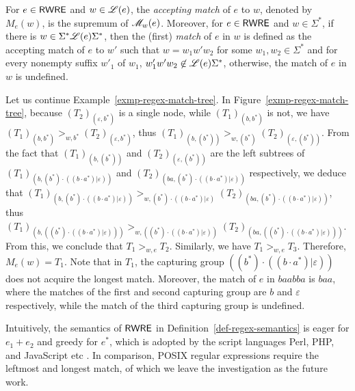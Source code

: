 \begin{definition}
  	For $e \in {\sf RWRE}$ and $w \in \mathscr{L}(e)$, the \emph{accepting match} of $e$ to $w$, denoted by $M_e(w)$, is the supremum of $\mathscr{M}_w(e)$. Moreover,  for $e \in {\sf RWRE}$ and $w \in \Sigma^\ast$, if there is $w \in  \Sigma^\ast\mathscr{L}(e)\Sigma^\ast$, then the (first) \emph{match} of $e$ in $w$ is defined as the accepting match of $e$ to $w'$ such that $w = w_1w'w_2$ for some $w_1,w_2\in \Sigma^\ast$ and for every nonempty suffix $w'_1$ of $w_1$, $w'_1w'w_2 \not \in \mathscr{L}(e)\Sigma^\ast$, otherwise, the match of $e$ in $w$ is undefined.  
%  	
  \end{definition}

\begin{example}\label{exmp-regex-semantics}
Let us continue Example~\ref{exmp-regex-match-tree}.  In Figure~\ref{exmp-regex-match-tree}, because $(T_2)_{(\varepsilon, b^\ast)}$ is a single node, while $(T_1)_{(b,b^\ast)}$ is not, we have $(T_1)_{(b,b^\ast)} >_{w, b^\ast} (T_2)_{(\varepsilon, b^\ast)}$, thus $(T_1)_{(b, (b^\ast))} >_{w, (b^\ast)} (T_2)_{(\varepsilon, (b^\ast))}$. From the fact that $(T_1)_{(b, (b^\ast))}$ and $(T_2)_{(\varepsilon, (b^\ast))}$ are the left subtrees of $(T_1)_{(b, (b^\ast) \cdot ((b\cdot a^\ast) | \varepsilon))}$ and $ (T_2)_{(ba, (b^\ast) \cdot ((b\cdot a^\ast) | \varepsilon))}$ respectively, we deduce that $(T_1)_{(b, (b^\ast) \cdot ((b\cdot a^\ast) | \varepsilon))} >_{w, (b^\ast) \cdot ((b\cdot a^\ast) | \varepsilon)} (T_2)_{(ba, (b^\ast) \cdot ((b\cdot a^\ast) | \varepsilon))}$, thus $(T_1)_{(b, ((b^\ast) \cdot ((b\cdot a^\ast) | \varepsilon)))} >_{w, ((b^\ast) \cdot ((b\cdot a^\ast) | \varepsilon))} (T_2)_{(ba, ((b^\ast) \cdot ((b\cdot a^\ast) | \varepsilon)))}$. From this, we conclude that $T_1 >_{w, e} T_2$. Similarly, we have $T_1 >_{w, e} T_3$. Therefore, $M_e(w) = T_1$. 
Note that in $T_1$, the capturing group $((b^\ast) \cdot ((b\cdot a^\ast) | \varepsilon))$ does not acquire the longest match. Moreover, the match of $e$ in $baabba$ is $baa$, where the matches of the first and second capturing group are $b$ and $\varepsilon$ respectively, while the match of the third capturing group is undefined.
 \end{example}
  
\begin{remark}
Intuitively, the semantics of ${\sf RWRE}$ in Definition~\ref{def-regex-semantics} is eager for $e_1 + e_2$ and greedy for $e^\ast$, which is adopted by the script languages Perl, PHP, and JavaScript etc \cite{MasterREbook}. In comparison, POSIX regular expressions require the leftmost and longest match, of which we leave the investigation as the future work. 
\end{remark}
  
  
  
%  
